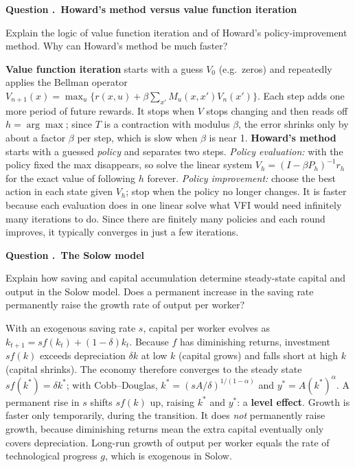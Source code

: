 \documentclass[11pt]{article}
\newcounter{qn}
\newcommand{\question}[1]{\refstepcounter{qn}\par\medskip
{\bfseries\color{ink}Question \theqn.\ #1}\par\smallskip}
\begin{document}
\question{Howard's method versus value function iteration}
Explain the logic of value function iteration and of Howard's policy-improvement method. Why can Howard's method be much faster?

\begin{answer}
\textbf{Value function iteration} starts with a guess $V_0$ (e.g.\ zeros) and repeatedly applies the Bellman operator $V_{n+1}(x)=\max_u\{r(x,u)+\beta\sum_{x'}M_u(x,x')V_n(x')\}$. Each step adds one more period of future rewards. It stops when $V$ stops changing and then reads off $h=\arg\max$; since $T$ is a contraction with modulus $\beta$, the error shrinks only by about a factor $\beta$ per step, which is slow when $\beta$ is near 1. \textbf{Howard's method} starts with a guessed \emph{policy} and separates two steps. \emph{Policy evaluation:} with the policy fixed the max disappears, so solve the linear system $V_h=(I-\beta P_h)^{-1}r_h$ for the exact value of following $h$ forever. \emph{Policy improvement:} choose the best action in each state given $V_h$; stop when the policy no longer changes. It is faster because each evaluation does in one linear solve what VFI would need infinitely many iterations to do. Since there are finitely many policies and each round improves, it typically converges in just a few iterations.
\end{answer}

\question{The Solow model}
Explain how saving and capital accumulation determine steady-state capital and output in the Solow model. Does a permanent increase in the saving rate permanently raise the growth rate of output per worker?

\begin{answer}
\begin{minipage}[t]{0.54\textwidth}\vspace{0pt}
With an exogenous saving rate $s$, capital per worker evolves as $k_{t+1}=sf(k_t)+(1-\delta)k_t$. Because $f$ has diminishing returns, investment $sf(k)$ exceeds depreciation $\delta k$ at low $k$ (capital grows) and falls short at high $k$ (capital shrinks). The economy therefore converges to the steady state $sf(k^*)=\delta k^*$; with Cobb--Douglas, $k^*=(sA/\delta)^{1/(1-\alpha)}$ and $y^*=A(k^*)^\alpha$. A permanent rise in $s$ shifts $sf(k)$ up, raising $k^*$ and $y^*$: a \textbf{level effect}. Growth is faster only temporarily, during the transition. It does \emph{not} permanently raise growth, because diminishing returns mean the extra capital eventually only covers depreciation. Long-run growth of output per worker equals the rate of technological progress $g$, which is exogenous in Solow.
\end{minipage}\hfill
\begin{minipage}[t]{0.43\textwidth}\vspace{0pt}\centering
\figSolow\\[4pt]
\figLevelGrowth
\end{minipage}
\end{answer}
\end{document}
